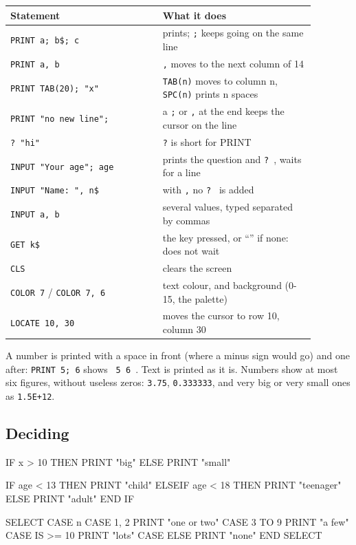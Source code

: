 \begin{center}
\small
\begin{tabular}{@{}>{\raggedright\arraybackslash}p{0.44\linewidth} >{\raggedright\arraybackslash}p{0.44\linewidth}@{}}
\toprule
\textbf{Statement} & \textbf{What it does} \\
\midrule
\texttt{PRINT a; b\$; c} & prints; \verb|;| keeps going on the same line \\
\texttt{PRINT a, b} & \verb|,| moves to the next column of 14 \\
\texttt{PRINT TAB(20); "x"} & \verb|TAB(n)| moves to column n, \verb|SPC(n)| prints n spaces \\
\texttt{PRINT "no new line";} & a \verb|;| or \verb|,| at the end keeps the cursor on the line \\
\texttt{? "hi"} & \verb|?| is short for PRINT \\
\texttt{INPUT "Your age"; age} & prints the question and \texttt{? }, waits for a line \\
\texttt{INPUT "Name: ", n\$} & with \verb|,| no \texttt{? } is added \\
\texttt{INPUT a, b} & several values, typed separated by commas \\
\texttt{GET k\$} & the key pressed, or ``'' if none: does not wait \\
\verb|CLS| & clears the screen \\
\texttt{COLOR 7} / \texttt{COLOR 7, 6} & text colour, and background (0-15, the palette) \\
\texttt{LOCATE 10, 30} & moves the cursor to row 10, column 30 \\
\bottomrule
\end{tabular}
\end{center}

A number is printed with a space in front (where a minus sign would
go) and one after: \texttt{PRINT 5; 6} shows \texttt{ 5  6 }. Text is printed as it
is. Numbers show at most six figures, without useless zeros: \verb|3.75|,
\verb|0.333333|, and very big or very small ones as \verb|1.5E+12|.

\subsection{Deciding}

\begin{type}
IF x > 10 THEN PRINT "big" ELSE PRINT "small"

IF age < 13 THEN
  PRINT "child"
ELSEIF age < 18 THEN
  PRINT "teenager"
ELSE
  PRINT "adult"
END IF

SELECT CASE n%
  CASE 1, 2
    PRINT "one or two"
  CASE 3 TO 9
    PRINT "a few"
  CASE IS >= 10
    PRINT "lots"
  CASE ELSE
    PRINT "none"
END SELECT
\end{type}

